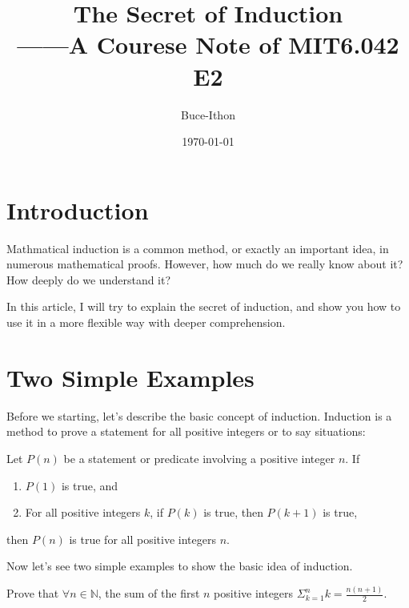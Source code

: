 \documentclass{Math_Note}
\title{The Secret of Induction \\ \small ------A Courese Note of MIT6.042 E2}
\author{Buce-Ithon}
\date{\today}
\begin{document}
\maketitle

\newpage
\tableofcontents
\newpage

\section{Introduction}
Mathmatical induction is a common method, or exactly an important idea, in numerous mathematical proofs. However, how much do we really know about it?
How deeply do we understand it? 

In this article, I will try to explain the secret of induction, and show you how to use it in a more flexible way with 
deeper comprehension.

\section{Two Simple Examples}
Before we starting, let's describe the basic concept of induction. Induction is a method to prove a statement for all positive integers or to say situations: 

\begin{mdframed}
\begin{thm}
    Let $P(n)$ be a statement or predicate involving a positive integer $n$. If 
    \begin{enumerate}
        \item $P(1)$ is true, and
        \item For all positive integers $k$, if $P(k)$ is true, then $P(k+1)$ is true,
    \end{enumerate}
    then $P(n)$ is true for all positive integers $n$.
\end{thm}
\end{mdframed}

Now let's see two simple examples to show the basic idea of induction.

\begin{prb}
    Prove that $\forall n \in \mathbb{N}$, the sum of the first $n$ positive integers $\Sigma_{k=1}^{n} k=\frac{n(n+1)}{2}$.
\end{prb}
\end{document}
